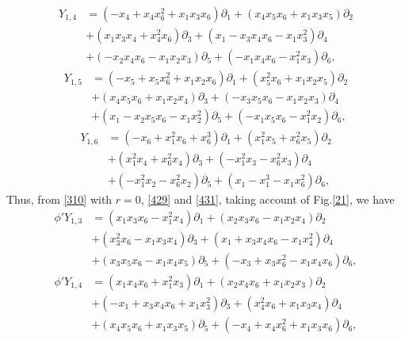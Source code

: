 \documentclass[12pt]{article}
\numberwithin{equation}{section}
\begin{document}
\begin{equation*}
\begin{split}
Y_{1,4}&=(-x_4+x_4x_6^2+x_1x_3x_6)\partial_1+(x_4x_5x_6+x_1x_3x_5)\partial_2\\
&+(x_1x_3x_4+x_4^2x_6)\partial_3+(x_1-x_3x_4x_6-x_1x_3^2)\partial_4\\
&+(-x_2x_4x_6-x_1x_2x_3)\partial_5+(-x_1x_4x_6-x_1^2x_3)\partial_6,
\end{split}
\end{equation*}
\begin{equation*}
\begin{split}
Y_{1,
5}&=(-x_5+x_5x_6^2+x_1x_2x_6)\partial_1+(x_5^2x_6+x_1x_2x_5)\partial_2\\
&+(x_4x_5x_6+x_1x_2x_4)\partial_3+(-x_3x_5x_6-x_1x_2x_3)\partial_4\\
&+(x_1-x_2x_5x_6-x_1x_2^2)\partial_5+(-x_1x_5x_6-x_1^2x_2)\partial_6,
\end{split}
\end{equation*}
\begin{equation*}
\begin{split}
Y_{1,
6}&=(-x_6+x_1^2x_6+x_6^3)\partial_1+(x_1^2x_5+x_6^2x_5)\partial_2\\
&+(x_1^2x_4+x_6^2x_4)\partial_3+(-x_1^2x_3-x_6^2x_3)\partial_4\\
&+(-x_1^2x_2-x_6^2x_2)\partial_5+(x_1-x_1^3-x_1x_6^2)\partial_6,
\end{split}
\end{equation*}
Thus, from \eqref{310} with $r=0$, \eqref{429} and \eqref{431},
taking account of Fig.\eqref{21}, we have
\begin{equation}\label{432}
\begin{split}
\phi 'Y_{1,
3}&=(x_1x_3x_6-x_1^2x_4)\partial_1+(x_2x_3x_6-x_1 x_2 x_4)\partial_2\\
&+(x_3^2x_6-x_1 x_3 x_4)\partial_3+(x_1+x_3x_4x_6-x_1x_4^2)\partial_4\\
&+(x_3x_5x_6-x_1x_4x_5)\partial_5+(-x_3+x_3x_6^2-x_1x_4x_6)\partial_6,
\end{split}
\end{equation}
\begin{equation*}
\begin{split}
\phi 'Y_{1,
4}&=(x_1x_4x_6+x_1^2x_3)\partial_1+(x_2x_4x_6+x_1x_2x_3)\partial_2\\
&+(-x_1+x_3x_4x_6+x_1x_3^2)\partial_3+(x_4^2x_6+x_1x_3x_4)\partial_4\\
&+(x_4x_5x_6+x_1x_3x_5)\partial_5+(-x_4+x_4x_6^2+x_1x_3x_6)\partial_6,
\end{split}
\end{equation*}
\end{document}
